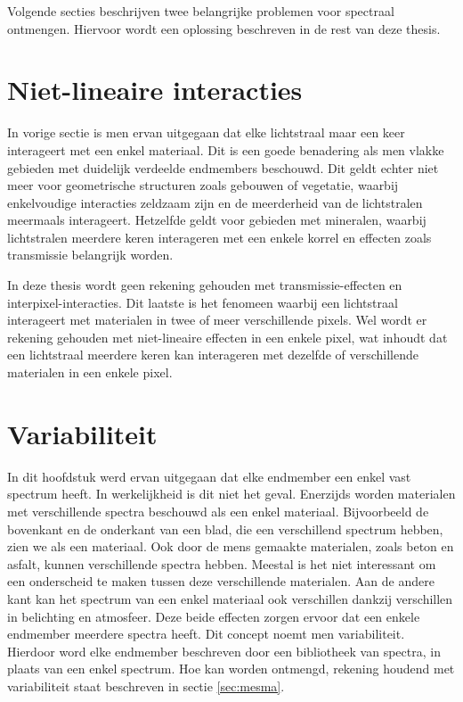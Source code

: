 \documentclass[12pt]{report}
\begin{document}
Volgende secties beschrijven twee belangrijke problemen voor spectraal ontmengen. Hiervoor wordt een oplossing beschreven in de rest van deze thesis.


\section{Niet-lineaire interacties}

In vorige sectie is men ervan uitgegaan dat elke lichtstraal maar een keer interageert met een enkel materiaal. Dit is een goede benadering als men vlakke gebieden met duidelijk verdeelde endmembers beschouwd. Dit geldt echter niet meer voor geometrische structuren zoals gebouwen of vegetatie, waarbij enkelvoudige interacties zeldzaam zijn en de meerderheid van de lichtstralen meermaals interageert. Hetzelfde geldt voor gebieden met mineralen, waarbij lichtstralen meerdere keren interageren met een enkele korrel en effecten zoals transmissie belangrijk worden.

In deze thesis wordt geen rekening gehouden met transmissie-effecten en interpixel-interacties. Dit laatste is het fenomeen waarbij een lichtstraal interageert met materialen in twee of meer verschillende pixels. Wel wordt er rekening gehouden met niet-lineaire effecten in een enkele pixel, wat inhoudt dat een lichtstraal meerdere keren kan interageren met dezelfde of verschillende materialen in een enkele pixel. 

\section{Variabiliteit}\label{sec:select}

In dit hoofdstuk werd ervan uitgegaan dat elke endmember een enkel vast spectrum heeft. In werkelijkheid is dit niet het geval. Enerzijds worden materialen met verschillende spectra beschouwd als een enkel materiaal. Bijvoorbeeld de bovenkant en de onderkant van een blad, die een verschillend spectrum hebben, zien we als een materiaal. Ook door de mens gemaakte materialen, zoals beton en asfalt, kunnen verschillende spectra hebben. Meestal is het niet interessant om een onderscheid te maken tussen deze verschillende materialen. Aan de andere kant kan het spectrum van een enkel materiaal ook verschillen dankzij verschillen in belichting en atmosfeer. Deze beide effecten zorgen ervoor dat een enkele endmember meerdere spectra heeft. Dit concept noemt men variabiliteit. Hierdoor word elke endmember beschreven door een bibliotheek van spectra, in plaats van een enkel spectrum. Hoe kan worden ontmengd, rekening houdend met variabiliteit staat beschreven in sectie \ref{sec:mesma}. 
\end{document}
